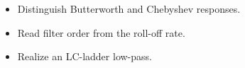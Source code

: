 \begin{objectives}
\begin{itemize}[leftmargin=1.4em,itemsep=2pt]
\item Distinguish Butterworth and Chebyshev responses.
\item Read filter order from the roll-off rate.
\item Realize an LC-ladder low-pass.
\end{itemize}
\end{objectives}
